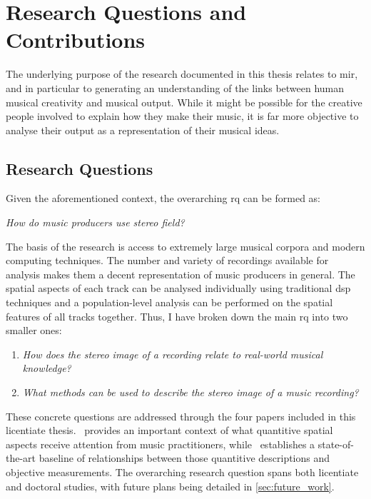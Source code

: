 \chapter{Research Questions and Contributions}
\label{sec:research_questions_and_contributions}

The underlying purpose of the research documented in this thesis relates to \gls{mir}, and in particular to generating an understanding of the links between human musical creativity and musical output. While it might be possible for the creative people involved to explain how they make their music, it is far more objective to analyse their output as a representation of their musical ideas.

\section{Research Questions}
\label{sec:research_questions}

Given the aforementioned context, the overarching \gls{rq} can be formed as:

\vspace{1em}
\noindent \hspace{4em} \textit{How do music producers use stereo field?}
\vspace{1em}

The basis of the research is access to extremely large musical corpora and modern computing techniques. The number and variety of recordings available for analysis makes them a decent representation of music producers in general. The spatial aspects of each track can be analysed individually using traditional \gls{dsp} techniques and a population-level analysis can be performed on the spatial features of all tracks together. Thus, I have broken down the main \gls{rq} into two smaller ones:

\vspace{1em}
\begin{enumerate}[
    leftmargin=4em,
    rightmargin=4em,
    itemsep=0.618em
]
\item[$RQ_1$:] \textit{How does the stereo image of a recording relate to real-world musical knowledge?} \label{rq:usecase}
\item[$RQ_2$:] \textit{What methods can be used to describe the stereo image of a music recording?} \label{rq:methods}
\end{enumerate}
\vspace{1em}

These concrete questions are addressed through the four papers included in this licentiate thesis. \rqa~provides an important context of what quantitive spatial aspects receive attention from music practitioners, while \rqb~establishes a state-of-the-art baseline of relationships between those quantitive descriptions and objective measurements. The overarching research question spans both licentiate and doctoral studies, with future plans being detailed in \cref{sec:future_work}.


